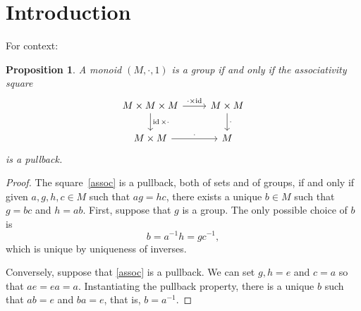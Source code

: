 \documentclass[a4paper,UKenglish,numberwithinsect,cleveref, autoref, thm-restate]{lipics-v2021}
\theoremstyle{plain} %
\newtheorem{myproposition}[mytheorem]{Proposition}
\theoremstyle{definition} %
\begin{document}

\section{Introduction}

For context:
\begin{myproposition}
 A monoid $(M,\cdot,1)$ is a group if and only if the associativity square
 \begin{equation}\label{assoc}
  \begin{tikzcd}
   M \times M \times M \ar{d}{\id\times\cdot} \ar{r}{\cdot\times\id} & M\times M \ar{d}{\cdot} \\
   M\times M \ar{r}{\cdot} & M
  \end{tikzcd}
 \end{equation}
 is a pullback.
\end{myproposition}
\begin{proof}
 The square~\eqref{assoc} is a pullback, both of sets and of groups, if and only if given $a,g,h,c\in M$ such that $ag=hc$, there exists a unique $b\in M$ such that $g=bc$ and $h=ab$.
 First, suppose that $g$ is a group. The only possible choice of $b$ is 
 \[
  b = a^{-1}h = gc^{-1},
 \]
 which is unique by uniqueness of inverses. 
 
 Conversely, suppose that \eqref{assoc} is a pullback. We can set $g,h=e$ and $c=a$ so that $ae=ea=a$. 
 Instantiating the pullback property, there is a unique $b$ such that $ab=e$ and $ba=e$, that is, $b=a^{-1}$.
\end{proof}
\end{document}
